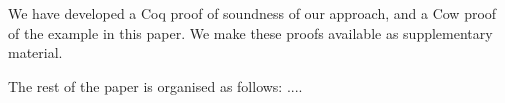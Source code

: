  We have developed a Coq proof of soundness of our approach, and a Cow proof of the
 example in this paper. We make these proofs available as supplementary material.


The rest of the paper is organised as follows: .... 
